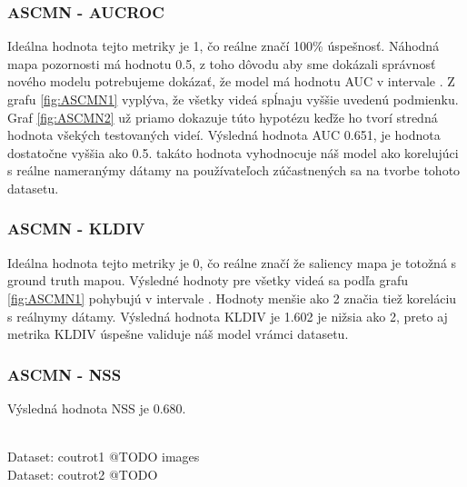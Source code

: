 \subsubsection{ASCMN - AUCROC}
Ideálna hodnota tejto metriky je 1, čo reálne značí 100\% úspešnosť.
Náhodná mapa pozornosti má hodnotu 0.5, z toho dôvodu aby sme dokázali správnosť nového modelu potrebujeme dokázať, že model má hodnotu AUC v intervale \interval[{0.5,1}].
Z grafu \ref{fig:ASCMN1} vyplýva, že všetky videá spĺnaju vyššie uvedenú podmienku.
Graf \ref{fig:ASCMN2} už priamo dokazuje túto hypotézu keďže ho tvorí stredná hodnota všekých testovaných videí.
Výsledná hodnota AUC 0.651, je hodnota dostatočne vyššia ako 0.5.
takáto hodnota vyhodnocuje náš model ako korelujúci s reálne nameranýmy dátamy na používateľoch zúčastnených sa na tvorbe tohoto datasetu.
\subsubsection{ASCMN - KLDIV}
Ideálna hodnota tejto metriky je 0, čo reálne značí že saliency mapa je totožná s ground truth mapou.
Výsledné hodnoty pre všetky videá sa podľa grafu \ref{fig:ASCMN1} pohybujú v intervale \interval[{1.5,1.7}].
Hodnoty menšie ako 2 značia tiež koreláciu s reálnymy dátamy.
Výsledná hodnota KLDIV je 1.602 je nižsia ako 2, preto aj metrika KLDIV úspešne validuje náš model vrámci datasetu.
\subsubsection{ASCMN - NSS}
Výsledná hodnota NSS je 0.680.

\\
Dataset: coutrot1\cite{accv}
@TODO images\\
Dataset: coutrot2\cite{accv}
@TODO \\

